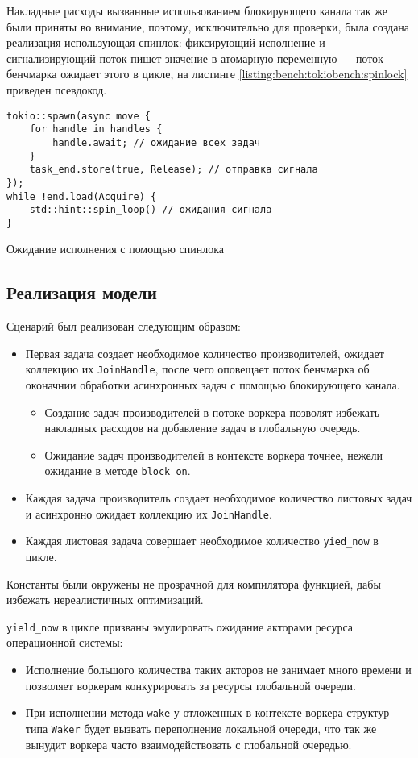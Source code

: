 Накладные расходы вызванные использованием блокирующего канала так же были приняты во внимание, поэтому, исключительно для проверки, была создана реализация использующая спинлок: фиксирующий исполнение и сигнализирующий поток пишет значение в атомарную переменную --- поток бенчмарка ожидает этого в цикле, на листинге \ref{listing:bench:tokiobench:spinlock} приведен псевдокод.

\begin{listing}[H]
    \begin{verbatim}
tokio::spawn(async move {
    for handle in handles {
        handle.await; // ожидание всех задач
    }
    task_end.store(true, Release); // отправка сигнала
});
while !end.load(Acquire) {
    std::hint::spin_loop() // ожидания сигнала
}
    \end{verbatim}
    \caption{Ожидание исполнения с помощью спинлока}
    \label{listing:bench:tokiobench:spinlock}
\end{listing}

\subsection{Реализация модели}

Сценарий был реализован следующим образом:

\begin{itemize}
    \item Первая задача создает необходимое количество производителей, ожидает коллекцию их \verb|JoinHandle|, после чего оповещает поток бенчмарка об оконачнии обработки асинхронных задач с помощью блокирующего канала.
    \begin{itemize}
        \item Создание задач производителей в потоке воркера позволят избежать накладных расходов на добавление задач в глобальную очередь.
        \item Ожидание задач производителей в контексте воркера точнее, нежели ожидание в методе \verb|block_on|.
    \end{itemize}
    \item Каждая задача производитель создает необходимое количество листовых задач и асинхронно ожидает коллекцию их \verb|JoinHandle|.
    \item Каждая листовая задача совершает необходимое количество \verb|yied_now| в цикле.
\end{itemize}

Константы  были окружены не прозрачной для компилятора функцией, дабы избежать нереалистичных оптимизаций.

\verb|yield_now| в цикле призваны эмулировать ожидание акторами ресурса операционной системы:

\begin{itemize}
    \item Исполнение большого количества таких акторов не занимает много времени и позволяет воркерам конкурировать за ресурсы глобальной очереди.
    \item При исполнении метода \verb|wake| у отложенных в контексте воркера структур типа \verb|Waker| будет вызвать переполнение локальной очереди, что так же вынудит воркера часто взаимодействовать с глобальной очередью.
\end{itemize}
